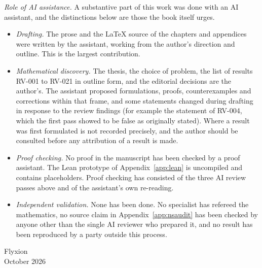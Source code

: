 \emph{Role of AI assistance.} A substantive part of this work was done with an AI assistant, and the distinctions below are those the book itself urges.
\begin{itemize}[leftmargin=1.5em]
\item \emph{Drafting.} The prose and the \LaTeX{} source of the chapters and appendices were written by the assistant, working from the author's direction and outline. This is the largest contribution.
\item \emph{Mathematical discovery.} The thesis, the choice of problem, the list of results RV-001 to RV-021 in outline form, and the editorial decisions are the author's. The assistant proposed formulations, proofs, counterexamples and corrections within that frame, and some statements changed during drafting in response to the review findings (for example the statement of RV-004, which the first pass showed to be false as originally stated). Where a result was first formulated is not recorded precisely, and the author should be consulted before any attribution of a result is made.
\item \emph{Proof checking.} No proof in the manuscript has been checked by a proof assistant. The Lean prototype of Appendix~\ref{app:lean} is uncompiled and contains placeholders. Proof checking has consisted of the three AI review passes above and of the assistant's own re-reading.
\item \emph{Independent validation.} None has been done. No specialist has refereed the mathematics, no source claim in Appendix~\ref{app:nsaudit} has been checked by anyone other than the single AI reviewer who prepared it, and no result has been reproduced by a party outside this process.
\end{itemize}

\bigskip
\noindent Flyxion\\
October 2026
